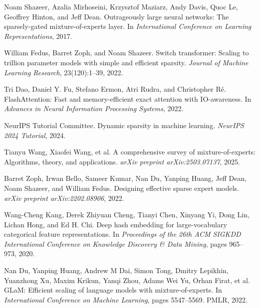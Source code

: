 \documentclass{article}
\numberwithin{equation}{section}
\theoremstyle{plain}
\theoremstyle{definition}
\theoremstyle{remark}
\begin{document}
\begin{thebibliography}{99}

Noam Shazeer, Azalia Mirhoseini, Krzysztof Maziarz, Andy Davis, Quoc Le, Geoffrey Hinton, and Jeff Dean.
\newblock Outrageously large neural networks: The sparsely-gated mixture-of-experts layer.
\newblock In \emph{International Conference on Learning Representations}, 2017.

William Fedus, Barret Zoph, and Noam Shazeer.
\newblock Switch transformer: Scaling to trillion parameter models with simple and efficient sparsity.
\newblock \emph{Journal of Machine Learning Research}, 23(120):1--39, 2022.

Tri Dao, Daniel Y. Fu, Stefano Ermon, Atri Rudra, and Christopher Ré.
\newblock FlashAttention: Fast and memory-efficient exact attention with IO-awareness.
\newblock In \emph{Advances in Neural Information Processing Systems}, 2022.

NeurIPS Tutorial Committee.
\newblock Dynamic sparsity in machine learning.
\newblock \emph{NeurIPS 2024 Tutorial}, 2024.

Tianyu Wang, Xiaofei Wang, et al.
\newblock A comprehensive survey of mixture-of-experts: Algorithms, theory, and applications.
\newblock \emph{arXiv preprint arXiv:2503.07137}, 2025.

Barret Zoph, Irwan Bello, Sameer Kumar, Nan Du, Yanping Huang, Jeff Dean, Noam Shazeer, and William Fedus.
\newblock Designing effective sparse expert models.
\newblock \emph{arXiv preprint arXiv:2202.08906}, 2022.

Wang-Cheng Kang, Derek Zhiyuan Cheng, Tianyi Chen, Xinyang Yi, Dong Lin, Lichan Hong, and Ed H. Chi.
\newblock Deep hash embedding for large-vocabulary categorical feature representations.
\newblock In \emph{Proceedings of the 26th ACM SIGKDD International Conference on Knowledge Discovery \& Data Mining}, pages 965--973, 2020.

Nan Du, Yanping Huang, Andrew M Dai, Simon Tong, Dmitry Lepikhin, Yuanzhong Xu, Maxim Krikun, Yanqi Zhou, Adams Wei Yu, Orhan Firat, et al.
\newblock GLaM: Efficient scaling of language models with mixture-of-experts.
\newblock In \emph{International Conference on Machine Learning}, pages 5547--5569. PMLR, 2022.


\end{thebibliography}
\end{document}
